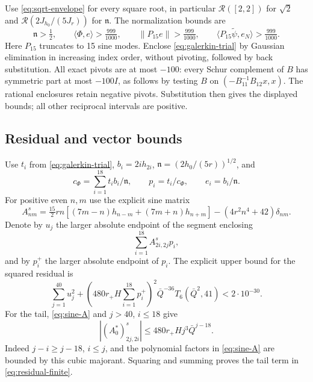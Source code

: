 \documentclass[a4paper,11pt]{article}
\numberwithin{equation}{section}
\theoremstyle{definition}
\theoremstyle{remark}
\newcommand{\norm}[1]{\lVert#1\rVert}
\newcommand{\ip}[2]{\langle#1,#2\rangle}
\begin{document}
Use \eqref{eq:sqrt-envelope} for every square root, in particular $\mathcal R([2,2])$ for $\sqrt2$ and $\mathcal R(2J_{h_0}/(5J_r))$ for $\mathfrak n$. The normalization bounds are
\[
 \mathfrak n>\tfrac12,\qquad
 \ip\Phi e>\tfrac{999}{1000},\qquad
 \norm{P_{15}e}>\tfrac{999}{1000},\qquad
 \ip{P_{15}\widetilde\psi}{e_N}>\tfrac{999}{1000}.
\]
Here $P_{15}$ truncates to 15 sine modes. Enclose \eqref{eq:galerkin-trial} by Gaussian elimination in increasing index order, without pivoting, followed by back substitution. All exact pivots are at most $-100$: every Schur complement of $B$ has symmetric part at most $-100I$, as follows by testing $B$ on $( -B_{11}^{-1}B_{12}x,x)$. The rational enclosures retain negative pivots. Substitution then gives the displayed bounds; all other reciprocal intervals are positive.

\subsection{Residual and vector bounds}
Use $t_i$ from \eqref{eq:galerkin-trial}, $b_i=2ih_{2i}$, $\mathfrak n=(2h_0/(5r))^{1/2}$, and
\[
 c_\Phi=\sum_{i=1}^{18}t_i b_i/\mathfrak n,\qquad
 p_i=t_i/c_\Phi,\qquad e_i=b_i/\mathfrak n.
\]
For positive even $n,m$ use the explicit sine matrix
\begin{equation}\label{eq:sine-A}
 A^s_{nm}=\tfrac{15}{2}rn\left[(7m-n)h_{n-m}+(7m+n)h_{n+m}\right]
 -(4r^2n^4+42)\delta_{nm}.
\end{equation}
Denote by $u_j$ the larger absolute endpoint of the segment enclosing
\[
 \sum_{i=1}^{18}A^s_{2i,2j}p_i,
\]
and by $p_i^+$ the larger absolute endpoint of $p_i$. The explicit upper bound for the squared residual is
\begin{equation}\label{eq:residual-finite}
 \sum_{j=1}^{40}u_j^2+
 \left(480r_+H\sum_{i=1}^{18}p_i^+\right)^2
 \bar Q^{-36}T_6(\bar Q^2,41)<2\cdot10^{-30}.
\end{equation}
For the tail, \eqref{eq:sine-A} and $j>40$, $i\le18$ give
\[
 |(A_0^*)^s_{2j,2i}|\le480r_+Hj^3\bar Q^{j-18}.
\]
Indeed $j-i\ge j-18$, $i\le j$, and the polynomial factors in \eqref{eq:sine-A} are bounded by this cubic majorant. Squaring and summing proves the tail term in \eqref{eq:residual-finite}.
\end{document}
